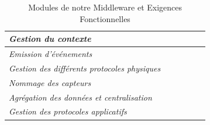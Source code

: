 \begin{table}[h!]
\begin{tabular}{|l|l|l|l|l|l|}
		\textit{Gestion du contexte}                         &                                                                                  &                                                                               & \checkmark                                                                 & \checkmark                                                                    &                                                                        \\ \hline
		\textit{Emission d'événements}                       &                                                                                  &                                                                               & \checkmark                                                                 & \checkmark                                                                    &                                                                        \\ \hline
		\textit{Gestion des différents protocoles physiques} &                                                                                  &                                                                               &                                                                            &                                                                               & \checkmark                                                             \\ \hline
		\textit{Nommage des capteurs}                        &                                                                                  & \checkmark                                                                    &                                                                            &                                                                               &                                                                        \\ \hline
		\textit{Agrégation des données et centralisation}    &                                                                                  &                                                                               & \checkmark                                                                 &                                                                               &                                                                        \\ \hline
		\textit{Gestion des protocoles applicatifs}          &                                                                                  &                                                                               &                                                                            &                                                                               & \checkmark                                                             \\ \hline
	\end{tabular}
	\caption{Modules de notre Middleware et Exigences Fonctionnelles}
\end{table}

